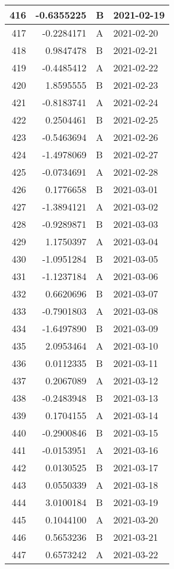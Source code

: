 \begin{tabular}{r|r|l|l}
\hline
416 & -0.6355225 & B & 2021-02-19\\
\hline
417 & -0.2284171 & A & 2021-02-20\\
\hline
418 & 0.9847478 & B & 2021-02-21\\
\hline
419 & -0.4485412 & A & 2021-02-22\\
\hline
420 & 1.8595555 & B & 2021-02-23\\
\hline
421 & -0.8183741 & A & 2021-02-24\\
\hline
422 & 0.2504461 & B & 2021-02-25\\
\hline
423 & -0.5463694 & A & 2021-02-26\\
\hline
424 & -1.4978069 & B & 2021-02-27\\
\hline
425 & -0.0734691 & A & 2021-02-28\\
\hline
426 & 0.1776658 & B & 2021-03-01\\
\hline
427 & -1.3894121 & A & 2021-03-02\\
\hline
428 & -0.9289871 & B & 2021-03-03\\
\hline
429 & 1.1750397 & A & 2021-03-04\\
\hline
430 & -1.0951284 & B & 2021-03-05\\
\hline
431 & -1.1237184 & A & 2021-03-06\\
\hline
432 & 0.6620696 & B & 2021-03-07\\
\hline
433 & -0.7901803 & A & 2021-03-08\\
\hline
434 & -1.6497890 & B & 2021-03-09\\
\hline
435 & 2.0953464 & A & 2021-03-10\\
\hline
436 & 0.0112335 & B & 2021-03-11\\
\hline
437 & 0.2067089 & A & 2021-03-12\\
\hline
438 & -0.2483948 & B & 2021-03-13\\
\hline
439 & 0.1704155 & A & 2021-03-14\\
\hline
440 & -0.2900846 & B & 2021-03-15\\
\hline
441 & -0.0153951 & A & 2021-03-16\\
\hline
442 & 0.0130525 & B & 2021-03-17\\
\hline
443 & 0.0550339 & A & 2021-03-18\\
\hline
444 & 3.0100184 & B & 2021-03-19\\
\hline
445 & 0.1044100 & A & 2021-03-20\\
\hline
446 & 0.5653236 & B & 2021-03-21\\
\hline
447 & 0.6573242 & A & 2021-03-22\\

\end{tabular}
